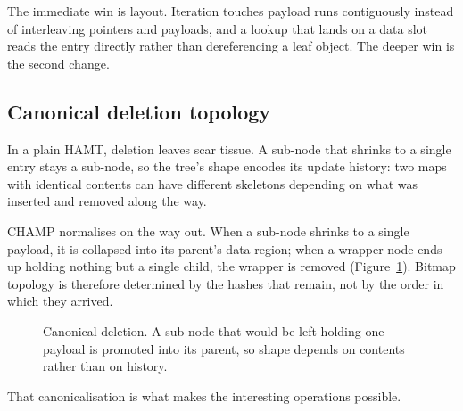 \documentclass[11pt,twoside,openright]{book}
\newcommand{\code}[1]{\texorpdfstring{\textcolor{d7ink}{\texttt{#1}}}{#1}}
\begin{document}
The immediate win is layout. Iteration touches payload runs contiguously instead
of interleaving pointers and payloads, and a lookup that lands on a data slot
reads the entry directly rather than dereferencing a leaf object. The deeper win
is the second change.

\subsection{Canonical deletion topology}

In a plain HAMT, deletion leaves scar tissue. A sub-node that shrinks to a single
entry stays a sub-node, so the tree's shape encodes its update history: two maps
with identical contents can have different skeletons depending on what was
inserted and removed along the way.

CHAMP normalises on the way out. When a sub-node shrinks to a single payload, it
is collapsed into its parent's data region; when a wrapper node ends up holding
nothing but a single child, the wrapper is removed (Figure~\ref{fig:champdelete}).
Bitmap topology is therefore determined by the hashes that remain, not by the
order in which they arrived.

\begin{figure}[htbp]
\centering
{}
\caption{Canonical deletion. A sub-node that would be left holding one payload is
promoted into its parent, so shape depends on contents rather than on history.}
\label{fig:champdelete}
\end{figure}

That canonicalisation is what makes the interesting operations possible.
\end{document}
